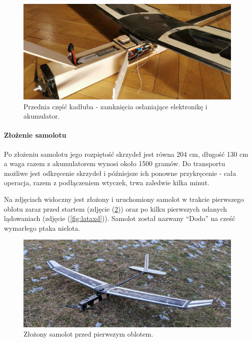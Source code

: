 \documentclass[12pt, a4paper]{article}
\let\oldref\ref
\renewcommand{\ref}[1]{(\oldref{#1})}
\begin{document}
\begin{figure}[ht]
    \centering
    \includegraphics[width=1\textwidth]{przod}
    \caption{Przednia część kadłuba - zamknięcia osłaniające elektronikę i akumulator.}
    \label{fig:przod}
\end{figure}

\FloatBarrier
\paragraph{Złożenie samolotu}\mbox{}

Po złożeniu samolotu jego rozpiętość skrzydeł jest równa 204 cm, długość 130 cm a waga razem z akumulatorem wynosi około 1500 gramów. Do transportu możliwe jest odkręcenie skrzydeł i późniejsze ich ponowne przykręcenie - cała operacja, razem z podłączeniem wtyczek, trwa zaledwie kilka minut. 

Na zdjęciach widoczny jest złożony i uruchomiony samolot w trakcie pierwszego oblotu zaraz przed startem (zdjęcie \ref{fig:gotowy}) oraz po kilku pierwszych udanych lądowaniach (zdjęcie \ref{fig:lataxd}). Samolot został nazwany ``Dodo'' na cześć wymarłego ptaka nielota. 

\begin{figure}[ht]
    \centering
    \includegraphics[width=1\textwidth]{dolotu}
    \caption{Złożony samolot przed pierwszym oblotem.}
    \label{fig:gotowy}
\end{figure}
\end{document}
